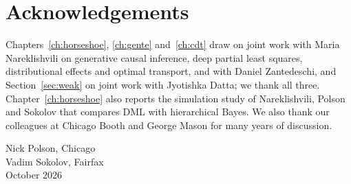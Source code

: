 \section*{Acknowledgements}

Chapters~\ref{ch:horseshoe}, \ref{ch:gente} and~\ref{ch:cdt} draw on joint work with Maria Nareklishvili on generative causal inference, deep partial least squares, distributional effects and optimal transport, and with Daniel Zantedeschi, and Section~\ref{sec:weak} on joint work with Jyotishka Datta; we thank all three. Chapter~\ref{ch:horseshoe} also reports the simulation study of Nareklishvili, Polson and Sokolov that compares DML with hierarchical Bayes. We also thank our colleagues at Chicago Booth and George Mason for many years of discussion.

\bigskip
\noindent Nick Polson, Chicago\\
Vadim Sokolov, Fairfax\\
October 2026
